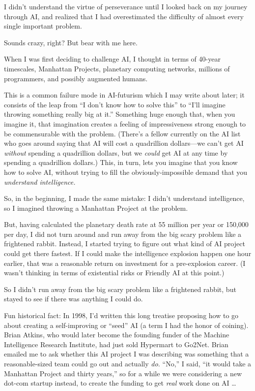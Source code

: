 {
 I didn't understand the virtue of perseverance
until I looked back on my journey through AI, and realized that I had
overestimated the difficulty of almost every single important problem.}

{
 Sounds crazy, right? But bear with me here.}

{
 When I was first deciding to challenge AI, I thought in terms of
40-year timescales, Manhattan Projects, planetary computing networks,
millions of programmers, and possibly augmented humans.}

{
 This is a common failure mode in AI-futurism which I may write
about later; it consists of the leap from ``I
don't know how to solve this'' to
``I'll imagine throwing something
really big at it.'' Something huge enough that, when
you imagine it, that imagination creates a feeling of impressiveness
strong enough to be commensurable with the problem.
(There's a fellow currently on the AI list who goes
around saying that AI will cost a quadrillion dollars---we
can't get AI \textit{without} spending a quadrillion
dollars, but we \textit{could} get AI at any time by spending a
quadrillion dollars.) This, in turn, lets you imagine that you know how
to solve AI, without trying to fill the obviously-impossible demand
that you \textit{understand intelligence.}}

{
 So, in the beginning, I made the same mistake: I
didn't understand intelligence, so I imagined throwing
a Manhattan Project at the problem.}

{
 But, having calculated the planetary death rate at 55 million per
year or 150,000 per day, I did not turn around and run away from the
big scary problem like a frightened rabbit. Instead, I started trying
to figure out what kind of AI project could get there fastest. If I
could make the intelligence explosion happen one hour earlier, that was
a reasonable return on investment for a pre-explosion career. (I
wasn't thinking in terms of existential risks or
Friendly AI at this point.)}

{
 So I didn't run away from the big scary problem
like a frightened rabbit, but stayed to see if there was anything I
could do.}

{
 Fun historical fact: In 1998, I'd written this
long treatise proposing how to go about creating a self-improving or
``seed'' AI (a term I had the honor
of coining). Brian Atkins, who would later become the founding funder
of the Machine Intelligence Research Institute, had just sold Hypermart
to Go2Net. Brian emailed me to ask whether this AI project I was
describing was something that a reasonable-sized team could go out and
actually \textit{do.} ``No,'' I
said, ``it would take a Manhattan Project and thirty
years,'' so for a while we were considering a new
dot-com startup instead, to create the funding to get \textit{real}
work done on AI \ldots}

